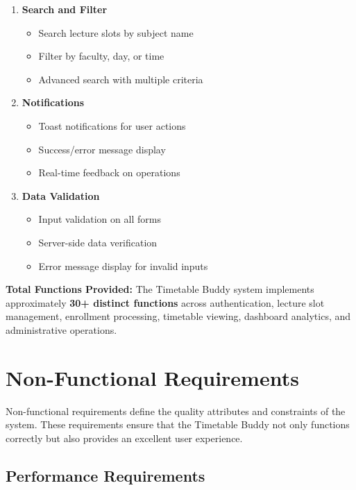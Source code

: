\begin{enumerate}[leftmargin=*]
    \item \textbf{Search and Filter}
    \begin{itemize}
        \item Search lecture slots by subject name
        \item Filter by faculty, day, or time
        \item Advanced search with multiple criteria
    \end{itemize}
    
    \item \textbf{Notifications}
    \begin{itemize}
        \item Toast notifications for user actions
        \item Success/error message display
        \item Real-time feedback on operations
    \end{itemize}
    
    \item \textbf{Data Validation}
    \begin{itemize}
        \item Input validation on all forms
        \item Server-side data verification
        \item Error message display for invalid inputs
    \end{itemize}
\end{enumerate}

\textbf{Total Functions Provided:} The Timetable Buddy system implements approximately \textbf{30+ distinct functions} across authentication, lecture slot management, enrollment processing, timetable viewing, dashboard analytics, and administrative operations.

\section{Non-Functional Requirements}

Non-functional requirements define the quality attributes and constraints of the system. These requirements ensure that the Timetable Buddy not only functions correctly but also provides an excellent user experience.

\subsection{Performance Requirements}

